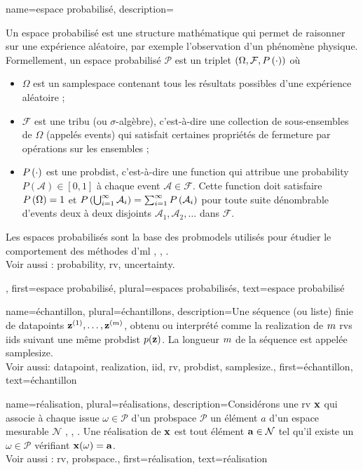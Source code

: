 {name={espace probabilisé}, 
	description={Un espace probabilisé est une structure mathématique qui permet de raisonner sur une expérience aléatoire, par exemple l’observation d’un phénomène physique. 
		Formellement, un espace probabilisé $\mathcal{P}$ est un triplet $(\Omega, \mathcal{F}, P\left(\cdot\right))$ où
		\begin{itemize}
			\item $\Omega$ est un \gls{samplespace} contenant tous les résultats possibles d’une expérience aléatoire ;
			\item $\mathcal{F}$ est une tribu (ou $\sigma$-algèbre), c’est-à-dire une collection de sous-ensembles de $\Omega$ (appelés \glspl{event}) qui satisfait certaines propriétés de fermeture par opérations sur les ensembles ;
			\item $P\left(\cdot\right)$ est une \gls{probdist}, c’est-à-dire une \gls{function} qui attribue une \gls{probability} $P(\mathcal{A}) \in [0,1]$ à chaque \gls{event} $\mathcal{A} \in \mathcal{F}$. Cette \gls{function} doit satisfaire $P\left(\Omega\right) = 1$ et $P\left(\bigcup_{i=1}^{\infty} \mathcal{A}_i\right) = \sum_{i=1}^{\infty} P\left(\mathcal{A}_i\right)$ pour toute suite dénombrable d’\glspl{event} deux à deux disjoints $\mathcal{A}_1, \mathcal{A}_2, \ldots$ dans $\mathcal{F}$.
		\end{itemize}
		Les espaces probabilisés sont la base des \glspl{probmodel} utilisés pour étudier le comportement des méthodes d’\gls{ml} \cite{BillingsleyProbMeasure}, \cite{GrayProbBook}, \cite{ross2013first}.
		\\
		Voir aussi : \gls{probability}, \gls{rv}, \gls{uncertainty}.},  
	first={espace probabilisé}, plural={espaces probabilisés},
	text={espace probabilisé}
}

{name={échantillon}, plural={échantillons}, 
	description={Une 
		séquence (ou liste) finie de \glspl{datapoint} ${\bf z}^{(1)}, \ldots, {\bf z}^{(m)}$, 
		obtenu ou interprété comme la \gls{realization} de $m$ \glspl{rv} \glspl{iid}
		suivant une même \gls{probdist} $p({\bf z})$. La longueur $m$ 
		de la séquence est appelée \gls{samplesize}.
		\\
		Voir aussi: \gls{datapoint}, \gls{realization}, \gls{iid}, \gls{rv}, \gls{probdist}, \gls{samplesize}.},
	first={échantillon},
	text={échantillon}
}

{name={réalisation}, plural={réalisations},
	description={Considérons une \gls{rv} ${\bf x}$ qui associe à chaque issue $\omega \in \mathcal{P}$ d’un \gls{probspace} $\mathcal{P}$ un élément $a$ d’un espace mesurable $\mathcal{N}$ \cite{RudinBookPrinciplesMatheAnalysis}, \cite{BillingsleyProbMeasure}, \cite{HalmosMeasure}. 
		Une réalisation de ${\bf x}$ est tout élément ${\bf a} \in \mathcal{N}$ tel qu’il existe un $\omega \in \mathcal{P}$ vérifiant ${\bf x}(\omega) = {\bf a}$.
		\\
		Voir aussi : \gls{rv}, \gls{probspace}.}, 
	first={réalisation},
	text={réalisation}  
}

